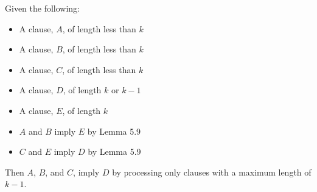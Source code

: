 \documentclass[manuscript]{acmart}
\begin{document}
    \begin{lemma}
        Given the following:
        \begin{itemize}
            \item A clause, $A$, of length less than $k$
            \item A clause, $B$, of length less than $k$
            \item A clause, $C$, of length less than $k$
            \item A clause, $D$, of length $k$ or $k - 1$
            \item A clause, $E$, of length $k$
            \item $A$ and $B$ imply $E$ by Lemma 5.9
            \item $C$ and $E$ imply $D$ by Lemma 5.9
        \end{itemize}
        Then $A$, $B$, and $C$, imply $D$ by processing only clauses with a maximum length of $k - 1$.
    \end{lemma}
\end{document}
